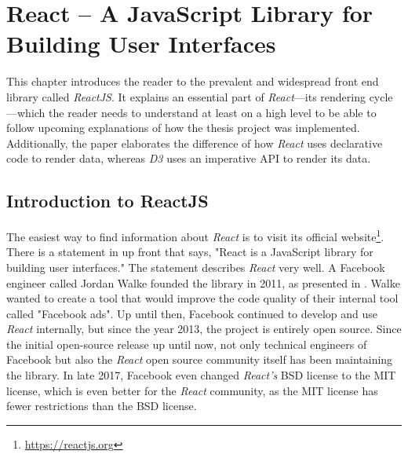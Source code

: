 \chapter{React – A JavaScript Library for Building User Interfaces}
\label{cha:react}

This chapter introduces the reader to the prevalent and widespread front end library called \emph{ReactJS}. It explains an essential part of \emph{React}---its rendering cycle---which the reader needs to understand at least on a high level to be able to follow upcoming explanations of how the thesis project was implemented. Additionally, the paper elaborates the difference of how \emph{React} uses declarative code to render data, whereas \emph{D3} uses an imperative API to render its data.

\section{Introduction to ReactJS}
\label{sec:reactIntro}

The easiest way to find information about \emph{React} is to visit its official website\footnote{\url{https://reactjs.org}}. There is a statement in \cite{React} up front that says, "React is a JavaScript library for building user interfaces." The statement describes \emph{React} very well. A Facebook engineer called Jordan Walke founded the library in 2011, as presented in \cite[05:30]{ReactFoundingVideo}. Walke wanted to create a tool that would improve the code quality of their internal tool called "Facebook ads". Up until then, Facebook continued to develop and use \emph{React} internally, but since the year 2013, the project is entirely open source. Since the initial open-source release up until now, not only technical engineers of Facebook but also the \emph{React} open source community itself has been maintaining the library. In late 2017, Facebook even changed \emph{React's} BSD license to the MIT license, which is even better for the \emph{React} community, as the MIT license has fewer restrictions than the BSD license.

